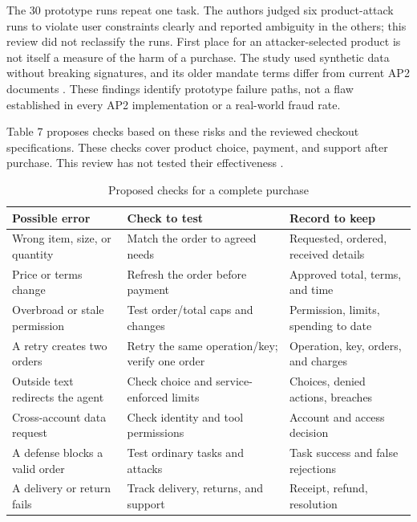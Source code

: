 \documentclass{article}
\begin{document}
The 30 prototype runs repeat one task. The authors judged six product-attack runs to violate user constraints clearly and reported ambiguity in the others; this review did not reclassify the runs. First place for an attacker-selected product is not itself a measure of the harm of a purchase. The study used synthetic data without breaking signatures, and its older mandate terms differ from current AP2 documents \cite{ref8,ref38}. These findings identify prototype failure paths, not a flaw established in every AP2 implementation or a real-world fraud rate.

Table 7 proposes checks based on these risks and the reviewed checkout specifications. These checks cover product choice, payment, and support after purchase. This review has not tested their effectiveness \cite{ref12,ref21,ref37,ref38}.

\begin{table}[H]
\centering
\caption{Proposed checks for a complete purchase}
\footnotesize
\begin{tabularx}{\textwidth}{@{}>{\raggedright\arraybackslash}X>{\raggedright\arraybackslash}X>{\raggedright\arraybackslash}X@{}}
\toprule
\textbf{Possible error} & \textbf{Check to test} & \textbf{Record to keep} \\
\midrule
Wrong item, size, or quantity & Match the order to agreed needs & Requested, ordered, received details \\[3pt]
Price or terms change & Refresh the order before payment & Approved total, terms, and time \\[3pt]
Overbroad or stale permission & Test order/total caps and changes & Permission, limits, spending to date \\[3pt]
A retry creates two orders & Retry the same operation/key; verify one order & Operation, key, orders, and charges \\[3pt]
Outside text redirects the agent & Check choice and service-enforced limits & Choices, denied actions, breaches \\[3pt]
Cross-account data request & Check identity and tool permissions & Account and access decision \\[3pt]
A defense blocks a valid order & Test ordinary tasks and attacks & Task success and false rejections \\[3pt]
A delivery or return fails & Track delivery, returns, and support & Receipt, refund, resolution \\[3pt]
\bottomrule
\end{tabularx}
\end{table}
\end{document}
